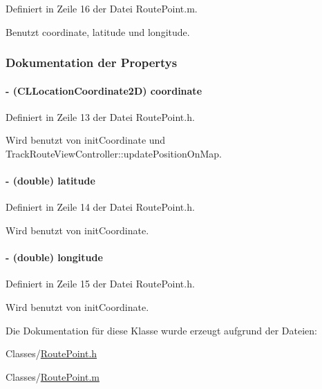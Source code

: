 Definiert in Zeile 16 der Datei RoutePoint.m.

Benutzt coordinate, latitude und longitude.

\subsubsection{Dokumentation der Propertys}
\hypertarget{interface_route_point_a477ee3d0030bfda3cc26ef34878913fc}{
\paragraph[{coordinate}]{\setlength{\rightskip}{0pt plus 5cm}-\/ (CLLocationCoordinate2D) coordinate}\hfill}
\label{interface_route_point_a477ee3d0030bfda3cc26ef34878913fc}


Definiert in Zeile 13 der Datei RoutePoint.h.

Wird benutzt von initCoordinate und TrackRouteViewController::updatePositionOnMap.\hypertarget{interface_route_point_a1a773711fc9a94e1a09febc90c9eec13}{
\paragraph[{latitude}]{\setlength{\rightskip}{0pt plus 5cm}-\/ (double) latitude}\hfill}
\label{interface_route_point_a1a773711fc9a94e1a09febc90c9eec13}


Definiert in Zeile 14 der Datei RoutePoint.h.

Wird benutzt von initCoordinate.\hypertarget{interface_route_point_a0396841a97d252adb4636291e6303435}{
\paragraph[{longitude}]{\setlength{\rightskip}{0pt plus 5cm}-\/ (double) longitude}\hfill}
\label{interface_route_point_a0396841a97d252adb4636291e6303435}


Definiert in Zeile 15 der Datei RoutePoint.h.

Wird benutzt von initCoordinate.

Die Dokumentation für diese Klasse wurde erzeugt aufgrund der Dateien:\begin{DoxyCompactItemize}
\item 
Classes/\hyperlink{_route_point_8h}{RoutePoint.h}\item 
Classes/\hyperlink{_route_point_8m}{RoutePoint.m}\end{DoxyCompactItemize}
